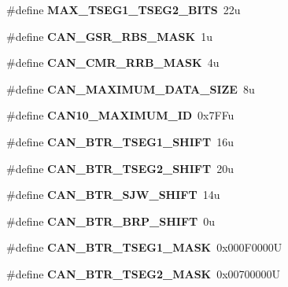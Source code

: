 \begin{DoxyCompactItemize}
\#define {\bfseries M\+A\+X\+\_\+\+T\+S\+E\+G1\+\_\+\+T\+S\+E\+G2\+\_\+\+B\+I\+TS}~22u
\item 
\mbox{\label{can-defs_8h_a376ecac1d04e79fec758e0ae5ac08b39}} 
\#define {\bfseries C\+A\+N\+\_\+\+G\+S\+R\+\_\+\+R\+B\+S\+\_\+\+M\+A\+SK}~1u
\item 
\mbox{\label{can-defs_8h_aaf0fc0ccab042ff1a0ee99057fccbdd2}} 
\#define {\bfseries C\+A\+N\+\_\+\+C\+M\+R\+\_\+\+R\+R\+B\+\_\+\+M\+A\+SK}~4u
\item 
\mbox{\label{can-defs_8h_ac1a2e431956965a6920322afabc33fd2}} 
\#define {\bfseries C\+A\+N\+\_\+\+M\+A\+X\+I\+M\+U\+M\+\_\+\+D\+A\+T\+A\+\_\+\+S\+I\+ZE}~8u
\item 
\mbox{\label{can-defs_8h_afb4f30bf4527c7258f403324ed647c5f}} 
\#define {\bfseries C\+A\+N10\+\_\+\+M\+A\+X\+I\+M\+U\+M\+\_\+\+ID}~0x7\+F\+Fu
\item 
\mbox{\label{can-defs_8h_a38316ae827c2f41fdb23c328f4476e25}} 
\#define {\bfseries C\+A\+N\+\_\+\+B\+T\+R\+\_\+\+T\+S\+E\+G1\+\_\+\+S\+H\+I\+FT}~16u
\item 
\mbox{\label{can-defs_8h_ad6263cfaff8a0c1e4214c17f3788233f}} 
\#define {\bfseries C\+A\+N\+\_\+\+B\+T\+R\+\_\+\+T\+S\+E\+G2\+\_\+\+S\+H\+I\+FT}~20u
\item 
\mbox{\label{can-defs_8h_a9b1c25c8d3dba1a88aea5c435c30fe1a}} 
\#define {\bfseries C\+A\+N\+\_\+\+B\+T\+R\+\_\+\+S\+J\+W\+\_\+\+S\+H\+I\+FT}~14u
\item 
\mbox{\label{can-defs_8h_aec7032a5920ab7ca04c0664b82b9b3e5}} 
\#define {\bfseries C\+A\+N\+\_\+\+B\+T\+R\+\_\+\+B\+R\+P\+\_\+\+S\+H\+I\+FT}~0u
\item 
\mbox{\label{can-defs_8h_a293ee7574e9579266b531f4234d264be}} 
\#define {\bfseries C\+A\+N\+\_\+\+B\+T\+R\+\_\+\+T\+S\+E\+G1\+\_\+\+M\+A\+SK}~0x000\+F0000U
\item 
\mbox{\label{can-defs_8h_a24c8f6ce1100c86137d3368fd556ad77}} 
\#define {\bfseries C\+A\+N\+\_\+\+B\+T\+R\+\_\+\+T\+S\+E\+G2\+\_\+\+M\+A\+SK}~0x00700000U

\end{DoxyCompactItemize}
